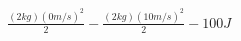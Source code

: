\documentclass[preview]{standalone}
\begin{document}
\begin{align*}
\frac{(2 kg)(0 m/s)^2}{2} - \frac{(2 kg)(10 m/s)^2}{2} -100 J
\end{align*}
\end{document}
